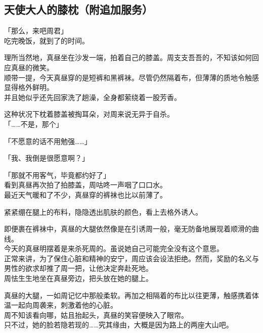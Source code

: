 \subsection{天使大人的膝枕（附追加服务）}

「那么，来吧周君」\\

吃完晚饭，就到了的时间。

理所当然地，真昼坐在沙发一端，拍着自己的膝盖。周支支吾吾的，不知该如何回应真昼的微笑。\\

顺带一提，今天真昼穿的是短裤和黑裤袜。尽管仍然隔着布，但薄薄的质地令触感显得格外鲜明。\\

并且她似乎还先回家洗了趟澡，全身都萦绕着一股芳香。

这种状况下枕着膝盖被掏耳朵，对周来说无异于自杀。\\

「……不是，那个」

「不愿意的话不用勉强……」

「我、我倒是很愿意啊？」

「那就不用客气，毕竟都约好了」\\

看到真昼再次拍了拍膝盖，周咕咚一声咽了口口水。\\

最近天气暖和了不少，真昼穿的裤袜也比以前薄了。

紧紧绷在腿上的布料，隐隐透出肌肤的颜色，看上去格外诱人。

即便裹在裤袜中，真昼的大腿依然像是在引诱周一般，毫无防备地展现着顺滑的曲线。\\

今天的真昼明摆着是来杀死周的。虽说她自己可能完全没有这个意思。\\

正常来讲，为了保住心脏和精神的安宁，周应该会设法拒绝。然而，奖励的名义与男性的欲求却推了周一把，让他决定奔赴死地。\\

周怯生生地坐在真昼旁边，把头放在她的腿上。

真昼的大腿，一如周记忆中那般柔软。再加之相隔着的布比以往更薄，触感携着体温一起向周袭来，刺激着他的心脏。\\

周不知该看向哪，姑且抬起头，真昼的笑容便映入了眼帘。\\

只不过，她的脸若隐若现的……究其缘由，大概是因为路上的两座大山吧。\\


